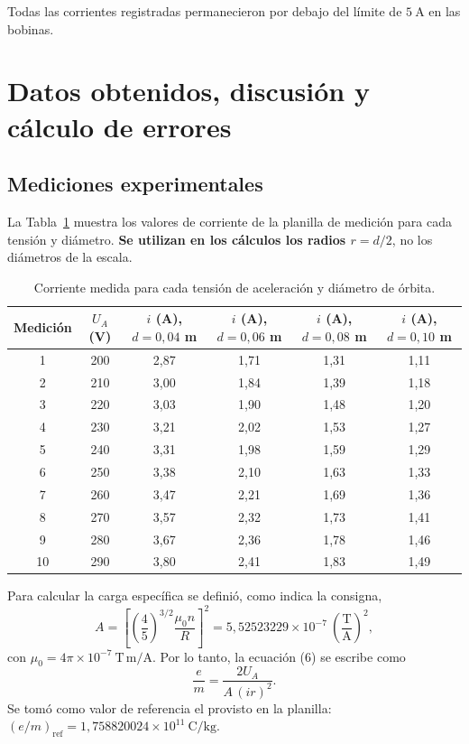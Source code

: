 \documentclass{article}
\begin{document}
Todas las corrientes registradas permanecieron por debajo del límite de $5\ \mathrm{A}$ en las bobinas.

\section{Datos obtenidos, discusión y cálculo de errores}
\subsection{Mediciones experimentales}
La Tabla~\ref{tab:mediciones} muestra los valores de corriente de la planilla de medición para cada tensión y diámetro. \textbf{Se utilizan en los cálculos los radios $r=d/2$}, no los diámetros de la escala.

\begin{table}[H]
\centering\small
\setlength{\aboverulesep}{0pt}
\setlength{\belowrulesep}{0pt}
\renewcommand{\arraystretch}{1.03}
\caption{Corriente medida para cada tensión de aceleración y diámetro de órbita.}\label{tab:mediciones}
\begin{tabular}{|c|c|c|c|c|c|} %
\toprule
Medición & $U_A$ (V) & $i$ (A), $d=0{,}04$ m & $i$ (A), $d=0{,}06$ m & $i$ (A), $d=0{,}08$ m & $i$ (A), $d=0{,}10$ m\\
\midrule
1 & 200 & 2,87 & 1,71 & 1,31 & 1,11\\
2 & 210 & 3,00 & 1,84 & 1,39 & 1,18\\
3 & 220 & 3,03 & 1,90 & 1,48 & 1,20\\
4 & 230 & 3,21 & 2,02 & 1,53 & 1,27\\
5 & 240 & 3,31 & 1,98 & 1,59 & 1,29\\
6 & 250 & 3,38 & 2,10 & 1,63 & 1,33\\
7 & 260 & 3,47 & 2,21 & 1,69 & 1,36\\
8 & 270 & 3,57 & 2,32 & 1,73 & 1,41\\
9 & 280 & 3,67 & 2,36 & 1,78 & 1,46\\
10 & 290 & 3,80 & 2,41 & 1,83 & 1,49\\
\bottomrule
\end{tabular}
\end{table}

Para calcular la carga específica se definió, como indica la consigna,
\begin{equation}
A={\left[{\left(\frac45\right)}^{3/2}\frac{\mu_0n}{R}\right]}^2=5{,}52523229\times10^{-7}\ {\left(\frac{\mathrm T}{\mathrm A}\right)}^2,
\label{eq:A}
\end{equation}
con $\mu_0=4\pi\times10^{-7}\ \mathrm{T\,m/A}$. Por lo tanto, la ecuación (6) se escribe como
\begin{equation}
\frac em=\frac{2U_A}{A\,{(ir)}^2}.
\label{eq:e_m_calc}
\end{equation}
Se tomó como valor de referencia el provisto en la planilla: ${(e/m)}_{\mathrm{ref}}=1{,}758820024\times10^{11}\ \mathrm{C/kg}$.
\end{document}
